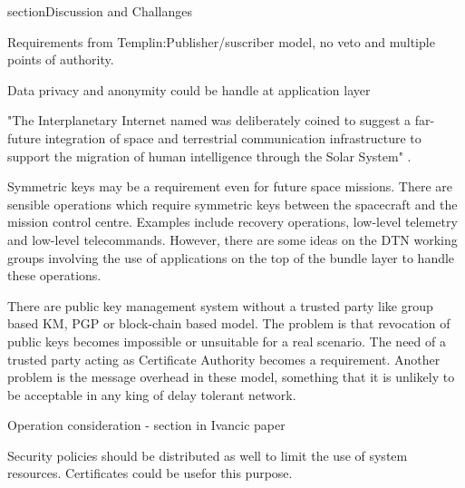 section{Discussion and Challanges}
\label{sec:discussion}

Requirements from Templin:Publisher/suscriber model, no veto and multiple points of authority. 

Data privacy and anonymity could be handle at application layer

"The Interplanetary Internet named was deliberately coined to suggest a far-future integration of space and terrestrial communication infrastructure to support the migration of human intelligence through the Solar System" \cite{burleigh2003interplanetary}. 


Symmetric keys may be a requirement even for future space missions. There are sensible operations which require symmetric keys between the spacecraft and the mission control centre. Examples include recovery operations, low-level telemetry and low-level telecommands.  However, there are some ideas on the DTN working groups involving the use of applications on the top of the bundle layer to handle these operations. 

There are public key management system without a trusted party like group based KM, PGP or block-chain based model. The problem is that revocation of public keys becomes impossible or unsuitable for a real scenario. The need of a trusted party acting as Certificate Authority becomes a requirement. Another problem is the message overhead in these model, something that it is unlikely to be acceptable in any king of delay tolerant network. 

Operation consideration - section in Ivancic paper

Security policies should be distributed as well to limit the use of system resources. Certificates could be usefor this purpose. 
